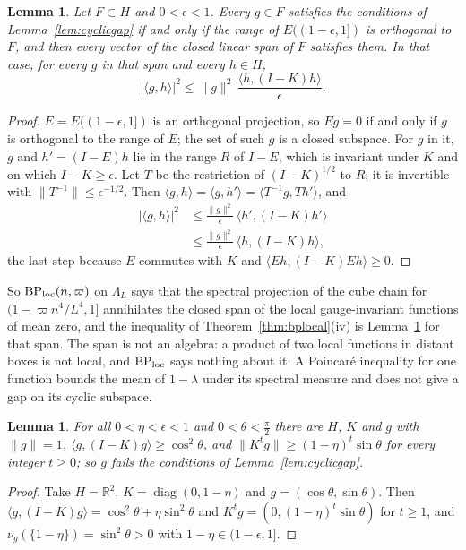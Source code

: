 \documentclass[aps,prd,twocolumn,superscriptaddress,nofootinbib,longbibliography,floatfix,amsmath,amssymb,10pt]{revtex4-2}
\newtheorem{lemma}[theorem]{Lemma}
\theoremstyle{definition}
\theoremstyle{remark}
\newcommand{\ip}[2]{\langle #1,#2\rangle}
\begin{document}
\begin{lemma}\label{lem:cyclicspan}
Let $F\subset H$ and $0<\epsilon<1$. Every $g\in F$ satisfies the
conditions of Lemma~\ref{lem:cyclicgap} if and only if the range of
$E((1-\epsilon,1])$ is orthogonal to $F$, and then every vector of the
closed linear span of $F$ satisfies them. In that case, for every $g$ in
that span and every $h\in H$,
\[
\lvert\ip gh\rvert^2\le\lVert g\rVert^2\,\frac{\ip h{(I-K)h}}\epsilon .
\]
\end{lemma}

\begin{proof}
$E=E((1-\epsilon,1])$ is an orthogonal projection, so $Eg=0$ if and only if
$g$ is orthogonal to the range of $E$; the set of such $g$ is a closed
subspace. For $g$ in it, $g$ and $h'=(I-E)h$ lie in the range $R$ of $I-E$,
which is invariant under $K$ and on which $I-K\ge\epsilon$. Let $T$ be the
restriction of $(I-K)^{1/2}$ to $R$; it is invertible with $\lVert T^{-1}
\rVert\le\epsilon^{-1/2}$. Then $\ip gh=\ip g{h'}=\ip{T^{-1}g}{Th'}$, and
\[
\begin{split}
\lvert\ip gh\rvert^2&\le\frac{\lVert g\rVert^2}\epsilon\,\ip{h'}{(I-K)h'}\\
&\le\frac{\lVert g\rVert^2}\epsilon\,\ip h{(I-K)h},
\end{split}
\]
the last step because $E$ commutes with $K$ and $\ip{Eh}{(I-K)Eh}\ge0$.
\end{proof}

So $\mathrm{BP}_{\rm loc}(n,\varpi)$ on $\Lambda_L$ says that the spectral
projection of the cube chain for $(1-\varpi n^4/L^4,1]$ annihilates the
closed span of the local gauge-invariant functions of mean zero, and the
inequality of Theorem~\ref{thm:bplocal}(iv) is Lemma~\ref{lem:cyclicspan}
for that span. The span is not an algebra: a product of two local
functions in distant boxes is not local, and $\mathrm{BP}_{\rm loc}$ says
nothing about it. A Poincar\'e inequality for one function bounds the
mean of $1-\lambda$ under its spectral measure and does not give a gap on
its cyclic subspace.

\begin{lemma}\label{lem:rayleighnogap}
For all $0<\eta<\epsilon<1$ and $0<\theta<\frac\pi2$ there are $H$, $K$ and
$g$ with $\lVert g\rVert=1$, $\ip g{(I-K)g}\ge\cos^2\theta$, and
$\lVert K^tg\rVert\ge(1-\eta)^t\sin\theta$ for every integer $t\ge0$; so
$g$ fails the conditions of Lemma~\ref{lem:cyclicgap}.
\end{lemma}

\begin{proof}
Take $H=\mathbb R^2$, $K=\operatorname{diag}(0,1-\eta)$ and $g=(\cos\theta,
\sin\theta)$. Then $\ip g{(I-K)g}=\cos^2\theta+\eta\sin^2\theta$ and
$K^tg=(0,(1-\eta)^t\sin\theta)$ for $t\ge1$, and $\nu_g(\{1-\eta\})=
\sin^2\theta>0$ with $1-\eta\in(1-\epsilon,1]$.
\end{proof}
\end{document}
